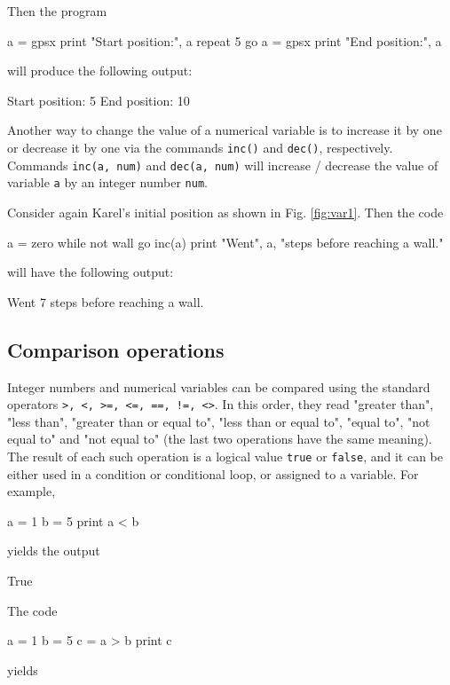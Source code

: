 \noindent
Then the program

\begin{bluecode}
a = gpsx
print "Start position:", a
repeat 5
    go
a = gpsx 
print "End position:", a
\end{bluecode}
will produce the following output:

\begin{bluecode}
Start position: 5
End position: 10
\end{bluecode}
Another way to change the value of a numerical variable is to increase it by one or 
decrease it by one via the commands {\tt inc()} and 
{\tt dec()}, respectively. Commands {\tt inc(a, num)} and 
{\tt dec(a, num)} will increase / decrease the value of variable {\tt a}
by an integer number {\tt num}.

Consider again Karel's initial position as shown 
in Fig. \ref{fig:var1}. Then the code

\begin{bluecode}
a = zero
while not wall
    go
    inc(a)
print "Went", a, "steps before reaching a wall."
\end{bluecode}
will have the following output:

\begin{bluecode}
Went 7 steps before reaching a wall.
\end{bluecode}

\subsection{Comparison operations}

Integer numbers and numerical variables can be compared using the 
standard operators {\tt >, <, >=, <=, ==, !=, <>}. In this order, 
they read "greater than", "less than", "greater than or equal to", 
"less than or equal to", "equal to", "not equal to" and "not equal to"
(the last two operations have the same meaning). The result of each such 
operation is a logical value {\tt true} or {\tt false}, and it can be 
either used in a condition or conditional loop, or assigned to 
a variable. For example,

\begin{bluecode}
a = 1
b = 5
print a < b
\end{bluecode}
yields the output

\begin{bluecode}
True
\end{bluecode}
The code

\begin{bluecode}
a = 1
b = 5
c = a > b
print c
\end{bluecode}
yields

